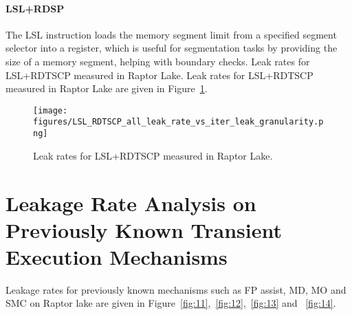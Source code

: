 






\paragraph{LSL+RDSP}
The LSL instruction loads the memory segment limit from a specified segment selector into a register, which is useful for segmentation tasks by providing the size of a memory segment, helping with boundary checks. Leak rates for LSL+RDTSCP measured in Raptor Lake.
Leak rates for LSL+RDTSCP measured in Raptor Lake are given in Figure~\ref{fig:lslllllll}.
\begin{figure}[h]
    \centering
    \texttt{[image: figures/LSL\_RDTSCP\_all\_leak\_rate\_vs\_iter\_leak\_granularity.png]}
    \caption{Leak rates for LSL+RDTSCP measured in Raptor Lake.}
    \label{fig:lslllllll}
\end{figure}


\section{Leakage Rate Analysis on Previously Known Transient Execution Mechanisms}
Leakage rates for previously known mechanisms such as FP assist, MD, MO and SMC on Raptor lake are given in Figure~\ref{fig:11},~\ref{fig:12},~\ref{fig:13} and ~\ref{fig:14}.

